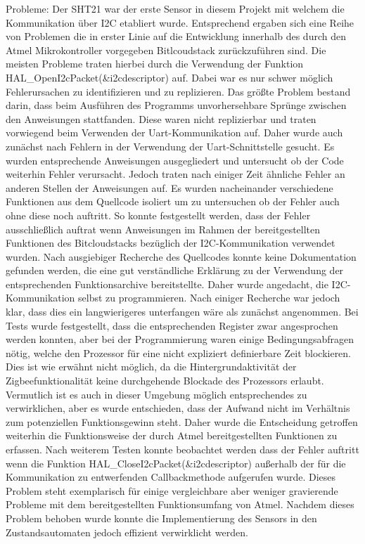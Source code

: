 \documentclass[]{article}
\begin{document}
		Probleme:
		Der SHT21 war der erste Sensor in diesem Projekt mit welchem die Kommunikation über I2C etabliert wurde. Entsprechend ergaben sich eine Reihe von Problemen die in erster Linie auf die Entwicklung innerhalb des durch den Atmel Mikrokontroller vorgegeben Bitlcoudstack zurückzuführen sind. Die meisten Probleme traten hierbei durch die Verwendung der Funktion HAL\_OpenI2cPacket(\&i2cdescriptor) auf. Dabei war es nur schwer möglich Fehlerursachen zu identifizieren und zu replizieren. Das größte Problem bestand darin, dass beim Ausführen des Programms unvorhersehbare Sprünge zwischen den Anweisungen stattfanden. Diese waren nicht replizierbar und traten vorwiegend beim Verwenden der Uart-Kommunikation auf. Daher wurde auch zunächst nach Fehlern in der Verwendung der Uart-Schnittstelle gesucht. Es wurden entsprechende Anweisungen ausgegliedert und untersucht ob der Code weiterhin Fehler verursacht. Jedoch traten nach einiger Zeit ähnliche Fehler an anderen Stellen der Anweisungen auf. Es wurden nacheinander verschiedene Funktionen aus dem Quellcode isoliert um zu untersuchen ob der Fehler auch ohne diese noch auftritt. So konnte festgestellt werden, dass der Fehler ausschließlich auftrat wenn Anweisungen im Rahmen der bereitgestellten Funktionen des Bitcloudstacks bezüglich der I2C-Kommunikation verwendet wurden. Nach ausgiebiger Recherche des Quellcodes konnte keine Dokumentation gefunden werden, die eine gut verständliche Erklärung zu der Verwendung der entsprechenden Funktionsarchive bereitstellte. Daher wurde angedacht, die I2C-Kommunikation selbst zu programmieren. Nach einiger Recherche war jedoch klar, dass dies ein langwierigeres unterfangen wäre als zunächst angenommen. Bei Tests wurde festgestellt, dass die entsprechenden Register zwar angesprochen werden konnten, aber bei der Programmierung waren einige Bedingungsabfragen nötig, welche den Prozessor für eine nicht expliziert definierbare Zeit blockieren. Dies ist wie erwähnt nicht möglich, da die Hintergrundaktivität der Zigbeefunktionalität keine durchgehende Blockade des Prozessors erlaubt. Vermutlich ist es auch in dieser Umgebung möglich entsprechendes zu verwirklichen, aber es wurde entschieden, dass der Aufwand nicht im Verhältnis zum potenziellen Funktionsgewinn steht. Daher wurde die Entscheidung getroffen weiterhin die Funktionsweise der durch Atmel bereitgestellten Funktionen zu erfassen. Nach weiterem Testen konnte beobachtet werden dass der Fehler auftritt wenn die Funktion HAL\_CloseI2cPacket(\&i2cdescriptor) außerhalb der für die Kommunikation zu entwerfenden Callbackmethode aufgerufen wurde. Dieses Problem steht exemplarisch für einige vergleichbare aber weniger gravierende Probleme mit dem bereitgestellten Funktionsumfang von Atmel. Nachdem dieses Problem behoben wurde konnte die Implementierung des Sensors in den Zustandsautomaten jedoch effizient verwirklicht werden. 
		
\end{document}

